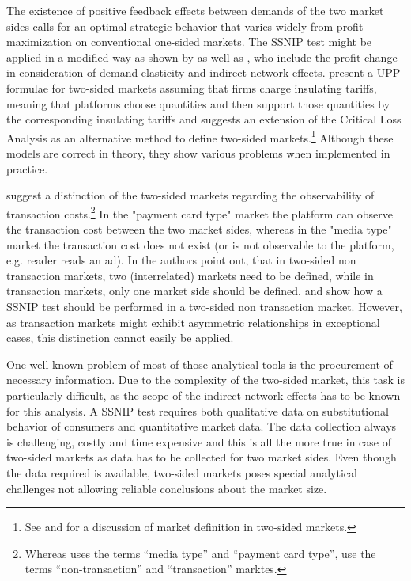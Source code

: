 \documentclass[12pt,a4paper,notitlepage]{article}
\begin{document}
The existence of positive feedback effects between demands of the two market sides calls for an optimal strategic behavior that varies widely from profit maximization on conventional one-sided markets. The SSNIP test might be applied in a modified way as shown by \cite{filistrucchi_market_2013} as well as \cite{evans_defining_2007}, who include the profit change in consideration of demand elasticity and indirect network effects. \cite{white_insulated_2012} present a UPP formulae for two-sided markets assuming that firms charge insulating tariffs, meaning that platforms choose quantities and then support those quantities by the corresponding insulating tariffs and \cite{noel_analyzing_2005} suggests an extension of the Critical Loss Analysis as an alternative method to define two-sided markets.\footnote{See \cite{evans_two-sided_2012} and \cite{filistrucchi_identifying_2012} for a discussion of market definition in two-sided markets.} Although these models are correct in theory, they show various problems when implemented in practice. 

\cite{filistrucchi_ssnip_2008} suggest a distinction of the two-sided markets regarding the observability of transaction costs.\footnote{Whereas \cite{filistrucchi_ssnip_2008} uses the terms “media type” and “payment card type”, \cite{filistrucchi_market_2013} use the terms “non-transaction” and “transaction” marktes.} In the "payment card type" market the platform can observe the transaction cost between the two market sides, whereas in the "media type" market the transaction cost does not exist (or is not observable to the platform, e.g. reader reads an ad). In \cite{filistrucchi_market_2013} the authors point out, that in two-sided non transaction markets, two (interrelated) markets need to be defined, while in transaction markets, only one market side should be defined. \cite{emch_market_2006} and \cite{alexandrov_antitrust_2011} show how a SSNIP test should be performed in a two-sided non transaction market. However, as transaction markets might exhibit asymmetric relationships in exceptional cases, this distinction cannot easily be applied. 

One well-known problem of most of those analytical tools is the procurement of necessary information. Due to the complexity of the two-sided market, this task is particularly difficult, as the scope of the indirect network effects has to be known for this analysis. A SSNIP test requires both qualitative data on substitutional behavior of consumers and quantitative market data. The data collection always is challenging, costly and time expensive and this is all the more true in case of two-sided markets as data has to be collected for two market sides. Even though the data required is available, two-sided markets poses special analytical challenges not allowing reliable conclusions about the market size. 
\end{document}
